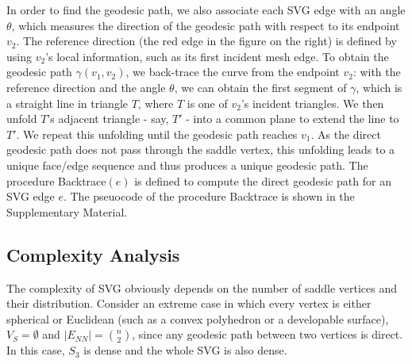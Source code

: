 \pichskip{5pt}%
  In order to find the geodesic path, we also associate each SVG
edge with an angle $\theta$, which measures the direction of the
geodesic path with respect to its endpoint $v_2$. The reference
direction (the red edge in the figure on the right) is defined by
using $v_2$'s local information, such as its first incident mesh
edge. To obtain the geodesic path $\gamma(v_1,v_2)$, we back-trace
the curve from the endpoint $v_2$: with the reference direction and
the angle $\theta$, we can obtain the first segment of $\gamma$,
which is a straight line in triangle $T$, where $T$ is one of
$v_2$'s incident triangles. We then unfold $T$'s adjacent triangle -
say, $T'$ - into a common plane to extend the line to $T'$. We
repeat this unfolding until the geodesic path reaches $v_1$. As the
direct geodesic path does not pass through the saddle vertex, this
unfolding leads to a unique face/edge sequence and thus produces a
unique geodesic path. The procedure Backtrace$(e)$ is defined to
compute the direct geodesic path for an SVG edge $e$. The pseuocode
of the procedure Backtrace is shown in the Supplementary Material.

\subsection{Complexity Analysis}
\label{subsec:complexity}

The complexity of SVG obviously depends on the number of saddle
vertices and their distribution. Consider an extreme case in which
every vertex is either spherical or Euclidean (such as a convex
polyhedron or a developable surface), $V_S=\emptyset$ and
$|E_{NN}|={n\choose 2}$, since any geodesic path between two
vertices is direct. In this case, $S_3$ is dense and the whole SVG
is also dense.

